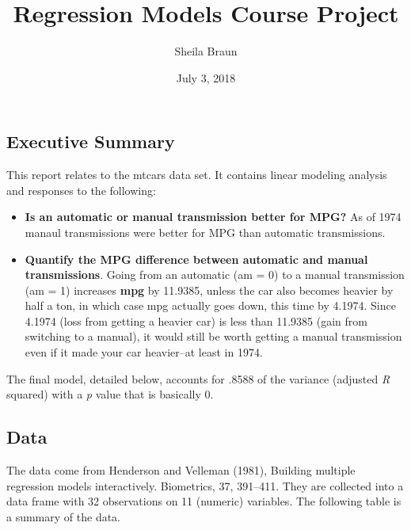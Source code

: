 \documentclass[]{article}
\title{Regression Models Course Project}
\author{Sheila Braun}
\date{July 3, 2018}
\begin{document}
\maketitle

\subsection{Executive Summary}\label{executive-summary}

This report relates to the mtcars data set. It contains linear modeling
analysis and responses to the following:

\begin{itemize}
\item
  \textbf{Is an automatic or manual transmission better for MPG?} As of
  1974 manaul transmissions were better for MPG than automatic
  transmissions.
\item
  \textbf{Quantify the MPG difference between automatic and manual
  transmissions}. Going from an automatic (am = 0) to a manual
  transmission (am = 1) increases \textbf{mpg} by 11.9385, unless the
  car also becomes heavier by half a ton, in which case mpg actually
  goes down, this time by 4.1974. Since 4.1974 (loss from getting a
  heavier car) is less than 11.9385 (gain from switching to a manual),
  it would still be worth getting a manual transmission even if it made
  your car heavier--at least in 1974.
\end{itemize}

The final model, detailed below, accounts for .8588 of the variance
(adjusted \emph{R} squared) with a \emph{p} value that is basically 0.

\subsection{Data}\label{data}

The data come from Henderson and Velleman (1981), Building multiple
regression models interactively. Biometrics, 37, 391--411. They are
collected into a data frame with 32 observations on 11 (numeric)
variables. The following table is a summary of the data.
\end{document}
